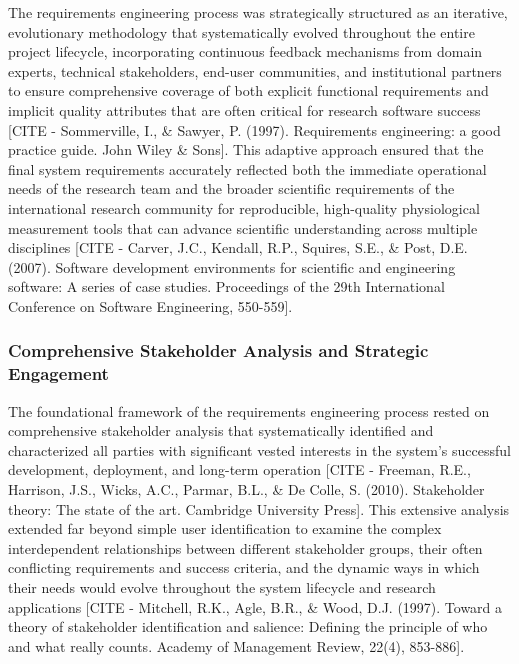 \documentclass[12pt,a4paper]{report}
\begin{document}
The requirements engineering process was strategically structured as an iterative, evolutionary methodology that
systematically evolved throughout the entire project lifecycle, incorporating continuous feedback mechanisms from domain
experts, technical stakeholders, end-user communities, and institutional partners to ensure comprehensive coverage of
both explicit functional requirements and implicit quality attributes that are often critical for research software
success [CITE - Sommerville, I., \& Sawyer, P. (1997). Requirements engineering: a good practice guide. John Wiley \& Sons].
This adaptive approach ensured that the final system requirements accurately reflected both the immediate operational
needs of the research team and the broader scientific requirements of the international research community for
reproducible, high-quality physiological measurement tools that can advance scientific understanding across multiple
disciplines [CITE - Carver, J.C., Kendall, R.P., Squires, S.E., \& Post, D.E. (2007). Software development environments for scientific and engineering software: A series of case studies. Proceedings of the 29th International Conference on Software Engineering, 550-559].

\subsubsection{Comprehensive Stakeholder Analysis and Strategic Engagement}

The foundational framework of the requirements engineering process rested on comprehensive stakeholder analysis that
systematically identified and characterized all parties with significant vested interests in the system's successful
development, deployment, and long-term
operation [CITE - Freeman, R.E., Harrison, J.S., Wicks, A.C., Parmar, B.L., \& De Colle, S. (2010). Stakeholder theory: The state of the art. Cambridge University Press].
This extensive analysis extended far beyond simple user identification to examine the complex interdependent
relationships between different stakeholder groups, their often conflicting requirements and success criteria, and the
dynamic ways in which their needs would evolve throughout the system lifecycle and research
applications [CITE - Mitchell, R.K., Agle, B.R., \& Wood, D.J. (1997). Toward a theory of stakeholder identification and salience: Defining the principle of who and what really counts. Academy of Management Review, 22(4), 853-886].
\end{document}
